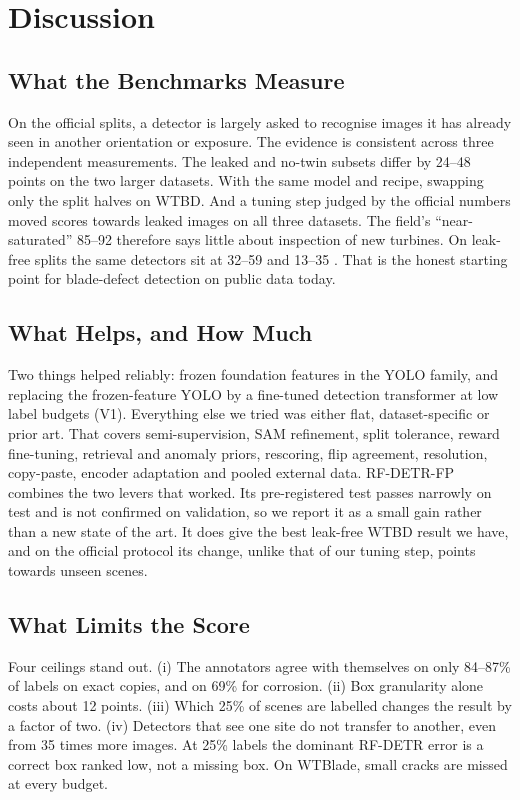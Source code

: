 \section{Discussion}
\label{sec:discussion}

\subsection{What the Benchmarks Measure}
On the official splits, a detector is largely asked to recognise images it has already seen in another orientation or exposure. The evidence is consistent across three independent measurements. The leaked and no-twin subsets differ by 24--48 \mfifty points on the two larger datasets. With the same model and recipe, swapping only the split halves \mcoco on WTBD. And a tuning step judged by the official numbers moved scores towards leaked images on all three datasets. The field's ``near-saturated'' 85--92 \mfifty therefore says little about inspection of new turbines. On leak-free splits the same detectors sit at 32--59 \mfifty and 13--35 \mcoco. That is the honest starting point for blade-defect detection on public data today.

\subsection{What Helps, and How Much}
Two things helped reliably: frozen foundation features in the YOLO family, and replacing the frozen-feature YOLO by a fine-tuned detection transformer at low label budgets (V1). Everything else we tried was either flat, dataset-specific or prior art. That covers semi-supervision, SAM refinement, split tolerance, reward fine-tuning, retrieval and anomaly priors, rescoring, flip agreement, resolution, copy-paste, encoder adaptation and pooled external data. RF-DETR-FP combines the two levers that worked. Its pre-registered test passes narrowly on test and is not confirmed on validation, so we report it as a small gain rather than a new state of the art. It does give the best leak-free WTBD result we have, and on the official protocol its change, unlike that of our tuning step, points towards unseen scenes.

\subsection{What Limits the Score}
Four ceilings stand out. (i) The annotators agree with themselves on only 84--87\% of labels on exact copies, and on 69\% for corrosion. (ii) Box granularity alone costs about 12 \apfifty points. (iii) Which 25\% of scenes are labelled changes the result by a factor of two. (iv) Detectors that see one site do not transfer to another, even from 35 times more images. At 25\% labels the dominant RF-DETR error is a correct box ranked low, not a missing box. On WTBlade, small cracks are missed at every budget.

